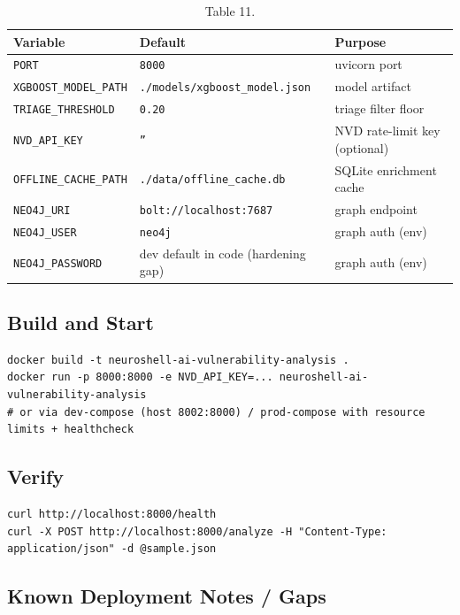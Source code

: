 \documentclass[10pt,journal,onecolumn]{IEEEtran}
\begin{document}
\begin{table}[h]
\caption{Table 11.}
\label{tab:t11}
\begin{tabularx}{\columnwidth}{l >{\raggedright\arraybackslash}X >{\raggedright\arraybackslash}X}
\toprule
\textbf{Variable} & \textbf{Default} & \textbf{Purpose}\\
\midrule
\texttt{PORT} & \texttt{8000} & uvicorn port\\
\texttt{XGBOOST\_MODEL\_PATH} & \texttt{.\allowbreak /\allowbreak models/\allowbreak xgboost\_\allowbreak model.\allowbreak json} & model artifact\\
\texttt{TRIAGE\_THRESHOLD} & \texttt{0.20} & triage filter floor\\
\texttt{NVD\_API\_KEY} & \texttt{''} & NVD rate-limit key (optional)\\
\texttt{OFFLINE\_CACHE\_PATH} & \texttt{./data/offline\_cache.db} & SQLite enrichment cache\\
\texttt{NEO4J\_URI} & \texttt{bolt://localhost:7687} & graph endpoint\\
\texttt{NEO4J\_USER} & \texttt{neo4j} & graph auth (env)\\
\texttt{NEO4J\_PASSWORD} & dev default in code (hardening gap) & graph auth (env)\\
\bottomrule
\end{tabularx}
\end{table}

\subsection{Build and Start}

\begin{lstlisting}
docker build -t neuroshell-ai-vulnerability-analysis .
docker run -p 8000:8000 -e NVD_API_KEY=... neuroshell-ai-vulnerability-analysis
# or via dev-compose (host 8002:8000) / prod-compose with resource limits + healthcheck
\end{lstlisting}

\subsection{Verify}

\begin{lstlisting}
curl http://localhost:8000/health
curl -X POST http://localhost:8000/analyze -H "Content-Type: application/json" -d @sample.json
\end{lstlisting}

\subsection{Known Deployment Notes / Gaps}
\end{document}
